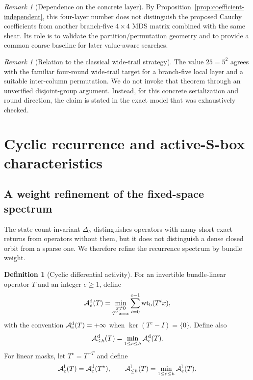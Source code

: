 \documentclass[10pt,reqno]{amsart}
\theoremstyle{plain}
\theoremstyle{remark}\newtheorem{remark}[theorem]{Remark}
\theoremstyle{definition}\newtheorem{definition}[theorem]{Definition}
\newcommand{\wt}{\operatorname{wt}}
\begin{document}
\begin{remark}[Dependence on the concrete layer]
By Proposition~\ref{prop:coefficient-independent}, this four-layer number does not distinguish the proposed Cauchy coefficients from another branch-five $4\times4$ MDS matrix combined with the same shear. Its role is to validate the partition/permutation geometry and to provide a common coarse baseline for later value-aware searches.
\end{remark}

\begin{remark}[Relation to the classical wide-trail strategy]
The value $25=5^2$ agrees with the familiar four-round wide-trail target for a branch-five local layer and a suitable inter-column permutation. We do not invoke that theorem through an unverified disjoint-group argument. Instead, for this concrete serialization and round direction, the claim is stated in the exact model that was exhaustively checked.
\end{remark}

\section{Cyclic recurrence and active-S-box characteristics}
\subsection{A weight refinement of the fixed-space spectrum}
The state-count invariant $\Delta_h$ distinguishes operators with many short exact returns from operators without them, but it does not distinguish a dense closed orbit from a sparse one. We therefore refine the recurrence spectrum by bundle weight.

\begin{definition}[Cyclic differential activity]\label{def:cyclic-activity}
For an invertible bundle-linear operator $T$ and an integer $e\ge1$, define
\begin{equation}
\mathcal A_e^{\rm d}(T)=
\min_{\substack{x\ne0\\T^e x=x}}
\sum_{i=0}^{e-1}\wt_{\rm b}(T^i x),
\label{eq:cyclic-activity}
\end{equation}
with the convention $\mathcal A_e^{\rm d}(T)=+\infty$ when $\ker(T^e-I)=\{0\}$. Define also
\[
\mathcal A_{\le h}^{\rm d}(T)=\min_{1\le e\le h}\mathcal A_e^{\rm d}(T).
\]
For linear masks, let $T^\star=T^{-T}$ and define
\[
\mathcal A_e^{\rm l}(T)=\mathcal A_e^{\rm d}(T^\star),
\qquad
\mathcal A_{\le h}^{\rm l}(T)=\min_{1\le e\le h}\mathcal A_e^{\rm l}(T).
\]
\end{definition}
\end{document}

